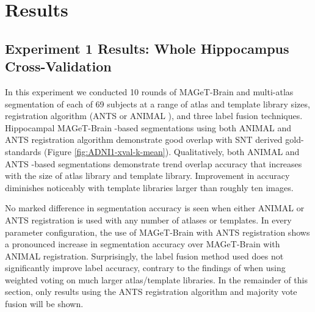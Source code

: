 \documentclass{article}\usepackage{graphicx, color}
\newcommand{\mb}{MAGeT-Brain }
\newcommand{\ants}{ANTS }
\newcommand{\animal}{ANIMAL }
\begin{document}


\section{Results}

\subsection{Experiment 1 Results: Whole Hippocampus Cross-Validation}

In this experiment we conducted 10 rounds of \mb and multi-atlas segmentation of
each of 69 subjects at a range of atlas and template library sizes, registration
algorithm (\ants or \animal), and three label fusion techniques.  Hippocampal
\mb-based segmentations using both \animal and \ants registration algorithm
demonstrate good overlap with SNT derived gold-standards (Figure
\ref{fig:ADNI1-xval-k-mean}). Qualitatively, both \animal and \ants-based
segmentations demonstrate trend overlap accuracy that increases with the size of
atlas library and template library. Improvement in accuracy diminishes noticeably
with template libraries larger than roughly ten images. 

No marked difference in segmentation accuracy is seen when either \animal or \ants
registration is used with any number of atlases or templates.  In every parameter 
configuration, the use of \mb with \ants registration shows a pronounced increase
in segmentation accuracy over \mb with \animal registration.  Surprisingly, the 
label fusion method used does not significantly improve label accuracy, contrary 
to the findings of \citet{Aljabar2009} when using weighted voting on much larger
atlas/template libraries. In the remainder of  this section, only results using
the \ants registration algorithm and majority vote fusion will be shown.
\end{document}
